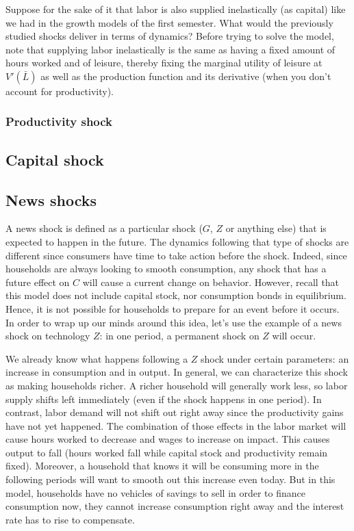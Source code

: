 \documentclass[12pt]{report}
\begin{document}
Suppose for the sake of it that labor is also supplied inelastically (as capital) like we had in the growth models of the first semester. What would the previously studied shocks deliver in terms of dynamics? Before trying to solve the model, note that supplying labor inelastically is the same as having a fixed amount of hours worked and of leisure, thereby fixing the marginal utility of leisure at $V'(\bar L)$ as well as the production function and its derivative (when you don't account for productivity).

\subsubsection{Productivity shock}



\subsection{Capital shock}



\subsection{News shocks}

A news shock is defined as a particular shock ($G$, $Z$ or anything else) that is expected to happen in the future. The dynamics following that type of shocks are different since consumers have time to take action before the shock. Indeed, since households are always looking to smooth consumption, any shock that has a future effect on $C$ will cause a current change on behavior. However, recall that this model does not include capital stock, nor consumption bonds in equilibrium. Hence, it is not possible for households to prepare for an event before it occurs. In order to wrap up our minds around this idea, let's use the example of a news shock on technology $Z$: in one period, a permanent shock on $Z$ will occur.

We already know what happens following a $Z$ shock under certain parameters: an increase in consumption and in output. In general, we can characterize this shock as making households richer. A richer household will generally work less, so labor supply shifts left immediately (even if the shock happens in one period). In contrast, labor demand will not shift out right away since the productivity gains have not yet happened. The combination of those effects in the labor market will cause hours worked to decrease and wages to increase on impact. This causes output to fall (hours worked fall while capital stock and productivity remain fixed). Moreover, a household that knows it will be consuming more in the following periods will want to smooth out this increase even today. But in this model, households have no vehicles of savings to sell in order to finance consumption now, they cannot increase consumption right away and the interest rate has to rise to compensate.
\end{document}
